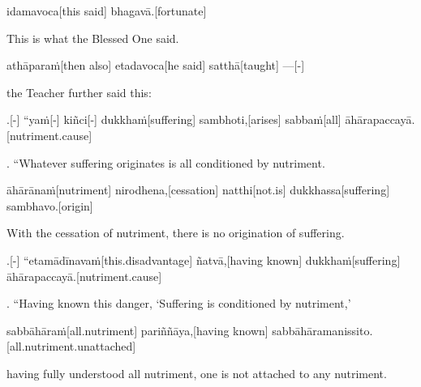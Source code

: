 \begin{samepage}
\begingl[glneveryline={\PaliGlossA,\PaliGlossB}]
idamavoca[this said] bhagavā.[fortunate]
\endgl
\nopagebreak
\linespread{0.5}
\begin{spacin}{0.2}
{\PaliGlossFT This is what the Blessed One said.}
\end{spacin}
\vskip 12pt
\end{samepage}
\begin{samepage}
\begingl[glneveryline={\PaliGlossA,\PaliGlossB}]
athāparaṁ[then also] etadavoca[he said] satthā[taught] —[-]
\endgl
\nopagebreak
\linespread{0.5}
\begin{spacin}{0.2}
{\PaliGlossFT the Teacher further said this:}
\end{spacin}
\vskip 12pt
\end{samepage}
\vskip 0.2in
\begin{samepage}
.[-] “yaṁ[-] kiñci[-] dukkhaṁ[suffering] sambhoti,[arises] sabbaṁ[all] āhārapaccayā.[nutriment.cause]
\endgl
\nopagebreak
\linespread{0.5}
\begin{spacin}{0.2}
{. “Whatever suffering originates  is all conditioned by nutriment.}
\end{spacin}
\vskip 12pt
\end{samepage}
\begin{samepage}
\begingl[glneveryline={\PaliGlossA,\PaliGlossB}]
āhārānaṁ[nutriment] nirodhena,[cessation] natthi[not.is] dukkhassa[suffering] sambhavo.[origin]
\endgl
\nopagebreak
\linespread{0.5}
\begin{spacin}{0.2}
{\PaliGlossFT With the cessation of nutriment, there is no origination of suffering.}
\end{spacin}
\vskip 12pt
\end{samepage}
\begin{samepage}
.[-] “etamādīnavaṁ[this.disadvantage] ñatvā,[having known] dukkhaṁ[suffering] āhārapaccayā.[nutriment.cause]
\endgl
\nopagebreak
\linespread{0.5}
\begin{spacin}{0.2}
{. “Having known this danger, ‘Suffering is conditioned by nutriment,’}
\end{spacin}
\vskip 12pt
\end{samepage}
\begin{samepage}
\begingl[glneveryline={\PaliGlossA,\PaliGlossB}]
sabbāhāraṁ[all.nutriment] pariññāya,[having known] sabbāhāramanissito.[all.nutriment.unattached]
\endgl
\nopagebreak
\linespread{0.5}
\begin{spacin}{0.2}
{\PaliGlossFT having fully understood all nutriment, one is not attached to any nutriment.}
\end{spacin}
\vskip 12pt
\end{samepage}
